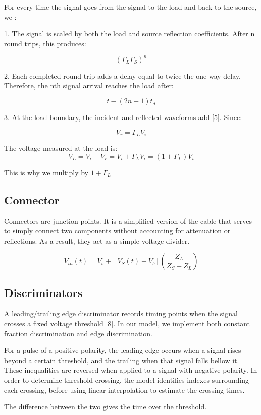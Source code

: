 \documentclass[10pt]{article}
\begin{document}
For every time the signal goes from the signal to the load and back to the source, we : 

1. The signal is scaled by both the load and source reflection coefficients. After n round trips, this produces: 

$$
(\Gamma_L\Gamma_S)^n
$$

2. Each completed round trip adds a delay equal to twice the one-way delay. Therefore, the nth signal arrival reaches the load after: 

$$
t - (2n+1)t_{d}
$$

3. At the load boundary, the incident and reflected waveforms add [5]. Since: 

$$
V_r = \Gamma_L V_i
$$

The voltage measured at the load is:
$$
V_L = V_i + V_r = V_i + \Gamma_LV_i = (1 + \Gamma_L)V_i
$$

This is why we multiply by $1+\Gamma_L$




\subsection{Connector}
Connectors are junction points. It is a simplified version of the cable that serves to simply connect two components without accounting for attenuation or reflections. As a result, they act as a simple voltage divider.

$$
V_{in}(t) = V_b + [V_S(t) - V_b](\frac{Z_L}{Z_S + Z_L})
$$

\subsection{Discriminators}

A leading/trailing edge discriminator records timing points when the signal crosses a fixed voltage threshold [8]. In our model, we implement both constant fraction discrimination and edge discrimination.

For a pulse of a positive polarity, the leading edge occurs when a signal rises beyond a certain threshold, and the trailing when that signal falls bellow it. These inequalities are reversed when applied to a signal with negative polarity. In order to determine threshold crossing, the model identifies indexes surrounding each crossing, before using linear interpolation to estimate the crossing times. 

The difference between the two gives the time over the threshold. 
\end{document}
